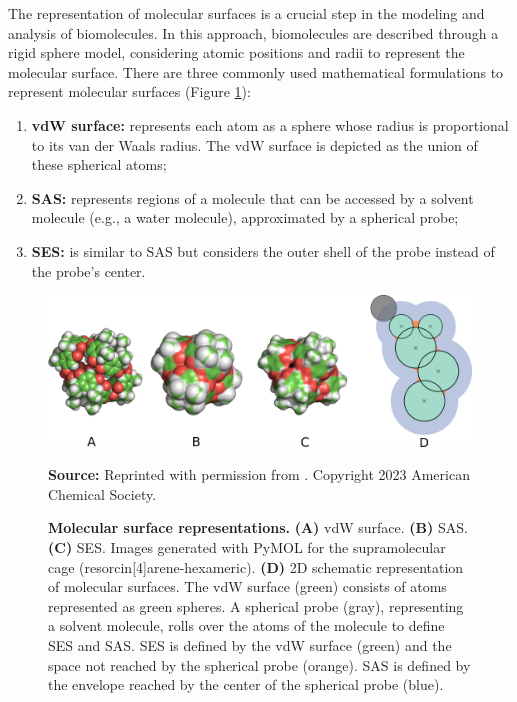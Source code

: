 \documentclass[Ingles]{phdthesis}
\begin{document}
The representation of molecular surfaces is a crucial step in the modeling and analysis of biomolecules. In this approach, biomolecules are described through a rigid sphere model, considering atomic positions and radii to represent the molecular surface. There are three commonly used mathematical formulations to represent molecular surfaces (Figure \ref{fig:surface-representation}):

\begin{enumerate}[label=\textbf{(\Alph*)}]
  \item \textbf{\acs{vdW} surface:} represents each atom as a sphere whose radius is proportional to its van der Waals radius. The \acs{vdW} surface is depicted as the union of these spherical atoms;
  \item \textbf{\acs{SAS}:} represents regions of a molecule that can be accessed by a solvent molecule (e.g., a water molecule), approximated by a spherical probe;
  \item \textbf{\acs{SES}:} is similar to \acs{SAS} but considers the outer shell of the probe instead of the probe's center.
\end{enumerate}
  
\begin{figure}[H]
  \centerline{\includegraphics[scale=0.9]{images/surface-representation.png}}
  \centerline{\tiny{\textbf{Source:} Reprinted with permission from \cite{guerra2023B}. Copyright 2023 American Chemical Society.}}
  \caption[Molecular surface representations]{\textbf{Molecular surface representations.} \textbf{(A)} \acs{vdW} surface. \textbf{(B)} \acs{SAS}. \textbf{(C)} \acs{SES}. Images generated with PyMOL for the supramolecular cage (resorcin[4]arene-hexameric). \textbf{(D)} 2D schematic representation of molecular surfaces. The \acs{vdW} surface (green) consists of atoms represented as green spheres. A spherical probe (gray), representing a solvent molecule, rolls over the atoms of the molecule to define \acs{SES} and \acs{SAS}. \acs{SES} is defined by the \acs{vdW} surface (green) and the space not reached by the spherical probe (orange). \acs{SAS} is defined by the envelope reached by the center of the spherical probe (blue).}
  \label{fig:surface-representation}
\end{figure}
\end{document}
